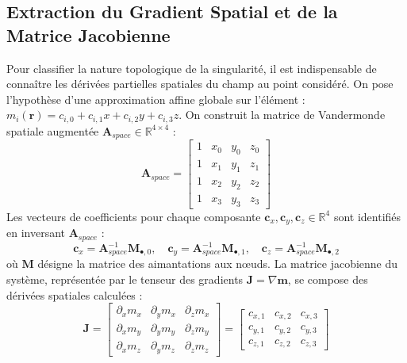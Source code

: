 \documentclass[11pt,a4paper]{article}
\begin{document}
\subsection{Extraction du Gradient Spatial et de la Matrice Jacobienne}
Pour classifier la nature topologique de la singularité, il est indispensable de connaître les dérivées partielles spatiales du champ au point considéré. On pose l'hypothèse d'une approximation affine globale sur l'élément : $m_i(\mathbf{r}) = c_{i,0} + c_{i,1}x + c_{i,2}y + c_{i,3}z$. On construit la matrice de Vandermonde spatiale augmentée $\mathbf{A}_{space} \in \mathbb{R}^{4 \times 4}$ :
\begin{equation}
\mathbf{A}_{space} = \begin{bmatrix}
1 & x_0 & y_0 & z_0 \\
1 & x_1 & y_1 & z_1 \\
1 & x_2 & y_2 & z_2 \\
1 & x_3 & y_3 & z_3
\end{bmatrix}
\end{equation}
Les vecteurs de coefficients pour chaque composante $\mathbf{c}_x, \mathbf{c}_y, \mathbf{c}_z \in \mathbb{R}^4$ sont identifiés en inversant $\mathbf{A}_{space}$ :
\begin{equation}
\mathbf{c}_x = \mathbf{A}_{space}^{-1} \mathbf{M}_{\bullet,0} , \quad \mathbf{c}_y = \mathbf{A}_{space}^{-1} \mathbf{M}_{\bullet,1} , \quad \mathbf{c}_z = \mathbf{A}_{space}^{-1} \mathbf{M}_{\bullet,2}
\end{equation}
où $\mathbf{M}$ désigne la matrice des aimantations aux nœuds. La matrice jacobienne du système, représentée par le tenseur des gradients $\mathbf{J} = \nabla\mathbf{m}$, se compose des dérivées spatiales calculées :
\begin{equation}
\mathbf{J} = \begin{bmatrix}
\partial_x m_x & \partial_y m_x & \partial_z m_x \\
\partial_x m_y & \partial_y m_y & \partial_z m_y \\
\partial_x m_z & \partial_y m_z & \partial_z m_z
\end{bmatrix} = \begin{bmatrix}
c_{x,1} & c_{x,2} & c_{x,3} \\
c_{y,1} & c_{y,2} & c_{y,3} \\
c_{z,1} & c_{z,2} & c_{z,3}
\end{bmatrix}
\end{equation}
\end{document}
